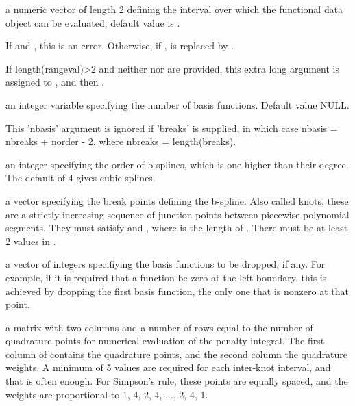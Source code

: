 \begin{Arguments}
\begin{ldescription}
\item[\code{rangeval}] a numeric vector of length 2 defining the interval over which the
functional data object can be evaluated;  default value is
.

If  and , this is an
error.  Otherwise, if , 
is replaced by .

If length(rangeval)>2 and neither  nor 
are provided, this extra long  argument is assigned
to , and then .

\item[\code{nbasis}] an integer variable specifying the number of basis functions.
Default value NULL.

This 'nbasis' argument is ignored if 'breaks' is supplied, in which
case nbasis = nbreaks + norder - 2, where nbreaks = length(breaks).

\item[\code{norder}] an integer specifying the order of b-splines, which is one higher
than their degree. The default of 4 gives cubic splines.

\item[\code{breaks}] a vector specifying the break points defining the b-spline.
Also called knots, these are a strictly increasing sequence
of junction points between piecewise polynomial segments.
They must satisfy  and
, where  is the
length of .  There must be at least 2 values in
.

\item[\code{dropind}] a vector of integers specifiying the basis functions to
be dropped, if any.  For example, if it is required that
a function be zero at the left boundary, this is achieved
by dropping the first basis function, the only one that
is nonzero at that point.

\item[\code{quadvals}] a matrix with two columns and a number of rows equal to the number
of quadrature points for numerical evaluation of the penalty
integral.  The first column of  contains the
quadrature points, and the second column the quadrature weights.  A
minimum of 5 values are required for each inter-knot interval, and
that is often enough.  For Simpson's rule, these points are equally
spaced, and the weights are proportional to 1, 4, 2, 4, ..., 2, 4,
1.


\end{ldescription}
\end{Arguments}
